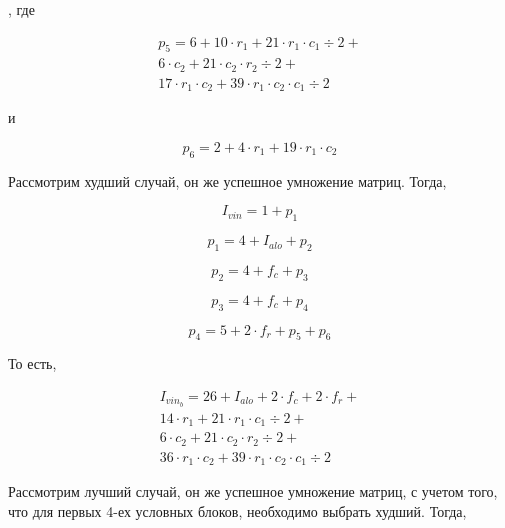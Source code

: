 \begin{enumerate}
    , где

    \begin{eqnarray*}
        p_5 = 6 + 10 \cdot r_1 + 21 \cdot r_1 \cdot c_1 \div 2 + \\
        6 \cdot c_2 + 21 \cdot c_2 \cdot r_2 \div 2 + \\
        17 \cdot r_1 \cdot c_2 + 39 \cdot r_1 \cdot c_2 \cdot c_1 \div 2
    \end{eqnarray*}

    и

    \begin{equation*}
        p_6 = 2 + 4 \cdot r_1 + 19 \cdot r_1 \cdot c_2
    \end{equation*}

    Рассмотрим худший случай,
    он же успешное умножение матриц.
    Тогда,

    \begin{equation*}
        I_{vin} = 1 + p_1
    \end{equation*}

    \begin{equation*}
        p_1 = 4 + I_{alo} + p_2
    \end{equation*}

    \begin{equation*}
        p_2 = 4 + f_c + p_3
    \end{equation*}

    \begin{equation*}
        p_3 = 4 + f_c + p_4
    \end{equation*}

    \begin{equation*}
        p_4 = 5 + 2 \cdot f_r + p_5 + p_6
    \end{equation*}

    То есть,

    \begin{eqnarray*}
        I_{vin_b} = 26 + I_{alo} + 2 \cdot f_c + 2 \cdot f_r + \\
        14 \cdot r_1 + 21 \cdot r_1 \cdot c_1 \div 2 + \\
        6 \cdot c_2 + 21 \cdot c_2 \cdot r_2 \div 2 + \\
        36 \cdot r_1 \cdot c_2 + 39 \cdot r_1 \cdot c_2 \cdot c_1 \div 2
    \end{eqnarray*}

    Рассмотрим лучший случай,
    он же успешное умножение матриц,
    с учетом того, что для первых 4-ех условных блоков,
    необходимо выбрать худший. Тогда,


\end{enumerate}
